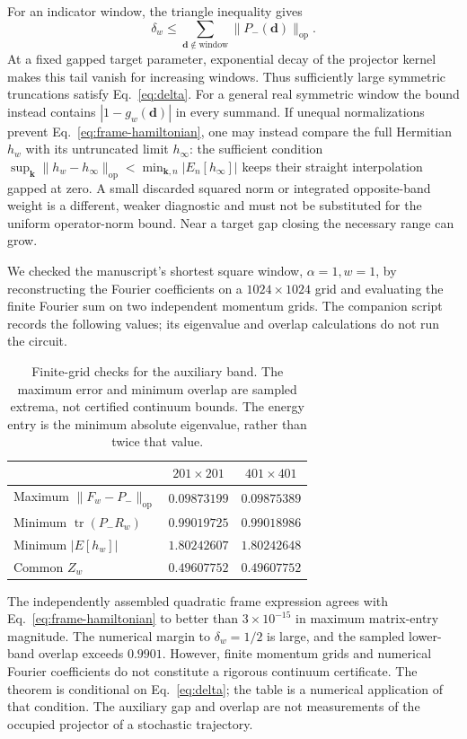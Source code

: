 \documentclass[aps,prb,onecolumn,nofootinbib,superscriptaddress]{revtex4-2}
\newcommand{\tr}{\operatorname{tr}}
\newcommand{\bk}{\boldsymbol k}
\begin{document}
For an indicator window, the triangle inequality gives
\begin{equation}
 \delta_w\le\sum_{\boldsymbol d\notin\mathrm{window}}
 \|P_-(\boldsymbol d)\|_{\mathrm{op}}.
 \label{eq:tail}
\end{equation}
At a fixed gapped target parameter, exponential decay of the projector kernel makes this tail vanish for increasing windows. Thus sufficiently large symmetric truncations satisfy Eq.~\eqref{eq:delta}. For a general real symmetric window the bound instead contains $|1-g_w(\boldsymbol d)|$ in every summand. If unequal normalizations prevent Eq.~\eqref{eq:frame-hamiltonian}, one may instead compare the full Hermitian $h_w$ with its untruncated limit $h_\infty$: the sufficient condition $\sup_{\bk}\|h_w-h_\infty\|_{\mathrm{op}}<\min_{\bk,n}|E_n[h_\infty]|$ keeps their straight interpolation gapped at zero. A small discarded squared norm or integrated opposite-band weight is a different, weaker diagnostic and must not be substituted for the uniform operator-norm bound. Near a target gap closing the necessary range can grow.

We checked the manuscript's shortest square window, $\alpha=1,w=1$, by reconstructing the Fourier coefficients on a $1024\times1024$ grid and evaluating the finite Fourier sum on two independent momentum grids. The companion script records the following values; its eigenvalue and overlap calculations do not run the circuit.
\begin{table}[t]
\caption{Finite-grid checks for the auxiliary band. The maximum error and minimum overlap are sampled extrema, not certified continuum bounds. The energy entry is the minimum absolute eigenvalue, rather than twice that value.}
\begin{ruledtabular}
\begin{tabular}{lcc}
 & $201\times201$ & $401\times401$\\
\hline
Maximum $\|F_w-P_-\|_{\mathrm{op}}$ & $0.09873199$ & $0.09875389$\\
Minimum $\tr(P_-R_w)$ & $0.99019725$ & $0.99018986$\\
Minimum $|E[h_w]|$ & $1.80242607$ & $1.80242648$\\
Common $Z_w$ & $0.49607752$ & $0.49607752$
\end{tabular}
\end{ruledtabular}
\label{tab:numerics}
\end{table}
The independently assembled quadratic frame expression agrees with Eq.~\eqref{eq:frame-hamiltonian} to better than $3\times10^{-15}$ in maximum matrix-entry magnitude. The numerical margin to $\delta_w=1/2$ is large, and the sampled lower-band overlap exceeds $0.9901$. However, finite momentum grids and numerical Fourier coefficients do not constitute a rigorous continuum certificate. The theorem is conditional on Eq.~\eqref{eq:delta}; the table is a numerical application of that condition. The auxiliary gap and overlap are not measurements of the occupied projector of a stochastic trajectory.
\end{document}
